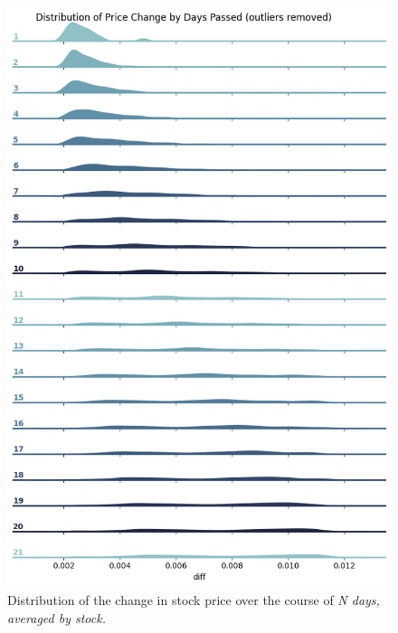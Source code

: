 \documentclass[conference]{IEEEtran}
\begin{document}
\begin{figure}
    \centering
    \includegraphics[width=\columnwidth]{figures/priceChangeByDays.png}
    \caption{Distribution of the change in stock price over the course of \it{N} days, averaged by stock.}
    \label{figure:priceChangeByDays}
\end{figure}
\end{document}

